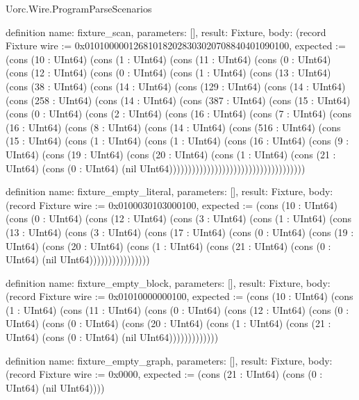 \begin{lexlean}{Uorc.Wire.ProgramParseScenarios}
\begin{semanticmodule}
definition{
  name: fixture_scan,
  parameters: [],
  result: Fixture,
  body: (record Fixture {wire := 0x010100000126810182028303020708840401090100, expected := (cons (10 : UInt64) (cons (1 : UInt64) (cons (11 : UInt64) (cons (0 : UInt64) (cons (12 : UInt64) (cons (0 : UInt64) (cons (1 : UInt64) (cons (13 : UInt64) (cons (38 : UInt64) (cons (14 : UInt64) (cons (129 : UInt64) (cons (14 : UInt64) (cons (258 : UInt64) (cons (14 : UInt64) (cons (387 : UInt64) (cons (15 : UInt64) (cons (0 : UInt64) (cons (2 : UInt64) (cons (16 : UInt64) (cons (7 : UInt64) (cons (16 : UInt64) (cons (8 : UInt64) (cons (14 : UInt64) (cons (516 : UInt64) (cons (15 : UInt64) (cons (1 : UInt64) (cons (1 : UInt64) (cons (16 : UInt64) (cons (9 : UInt64) (cons (19 : UInt64) (cons (20 : UInt64) (cons (1 : UInt64) (cons (21 : UInt64) (cons (0 : UInt64) (nil UInt64)))))))))))))))))))))))))))))))))))})
}

definition{
  name: fixture_empty_literal,
  parameters: [],
  result: Fixture,
  body: (record Fixture {wire := 0x0100030103000100, expected := (cons (10 : UInt64) (cons (0 : UInt64) (cons (12 : UInt64) (cons (3 : UInt64) (cons (1 : UInt64) (cons (13 : UInt64) (cons (3 : UInt64) (cons (17 : UInt64) (cons (0 : UInt64) (cons (19 : UInt64) (cons (20 : UInt64) (cons (1 : UInt64) (cons (21 : UInt64) (cons (0 : UInt64) (nil UInt64)))))))))))))))})
}

definition{
  name: fixture_empty_block,
  parameters: [],
  result: Fixture,
  body: (record Fixture {wire := 0x01010000000100, expected := (cons (10 : UInt64) (cons (1 : UInt64) (cons (11 : UInt64) (cons (0 : UInt64) (cons (12 : UInt64) (cons (0 : UInt64) (cons (0 : UInt64) (cons (20 : UInt64) (cons (1 : UInt64) (cons (21 : UInt64) (cons (0 : UInt64) (nil UInt64))))))))))))})
}

definition{
  name: fixture_empty_graph,
  parameters: [],
  result: Fixture,
  body: (record Fixture {wire := 0x0000, expected := (cons (21 : UInt64) (cons (0 : UInt64) (nil UInt64)))})
}


\end{semanticmodule}
\end{lexlean}
